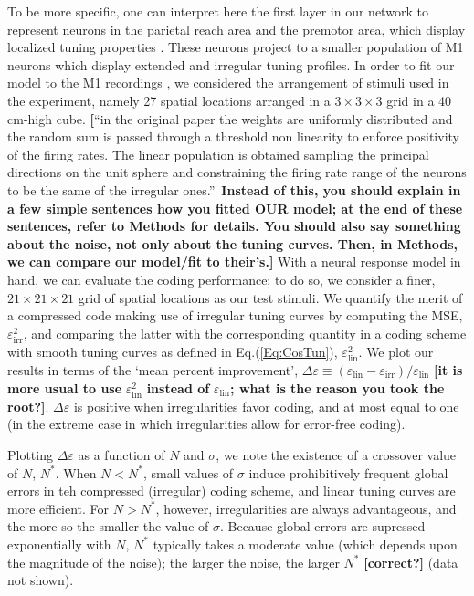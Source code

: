 \documentclass[a4paper]{article}%
\begin{document}
To be more specific, one can interpret here the first layer in our network to
represent neurons in the parietal reach area and the premotor area, which
display localized tuning properties \cite{Andersen1985EncodingNeurons}. These
neurons project to a smaller population of M1 neurons which display extended
and irregular tuning profiles. In order to fit our model to the M1 recordings
\cite{Lalazar2016TuningConnectivity}, we considered the arrangement of stimuli
used in the experiment, namely 27 spatial locations arranged in a
$3\times3\times3$ grid in a 40 cm-high cube.\textbf{ [}\textquotedblleft in
the original paper the weights are uniformly distributed and the random sum is
passed through a threshold non linearity to enforce positivity of the firing
rates. The linear population is obtained sampling the principal directions on
the unit sphere and constraining the firing rate range of the neurons to be
the same of the irregular ones.\textquotedblright\ \textbf{Instead of this,
you should explain in a few simple sentences how you fitted OUR model; at the
end of these sentences, refer to Methods for details. You should also say
something about the noise, not only about the tuning curves. Then, in Methods,
we can compare our model/fit to their's.] }With a neural response model in
hand, we can evaluate the coding performance; to do so, we consider a finer,
$21\times21\times21$ grid of spatial locations as our test stimuli. We
quantify the merit of a compressed code making use of irregular tuning curves
by computing the MSE, $\varepsilon_{\text{irr}}^{2}$, and comparing the latter
with the corresponding quantity in a coding scheme with smooth tuning curves
as defined in Eq.(\ref{Eq:CosTun}), $\varepsilon_{\text{lin}}^{2}$. We plot
our results in terms of the `mean percent improvement', $\Delta\varepsilon
\equiv\left(  \varepsilon_{\text{lin}}-\varepsilon_{\text{irr}}\right)
/\varepsilon_{\text{lin}}$ \textbf{[it is more usual to use }$\varepsilon
_{\text{lin}}^{2}$\textbf{ instead of }$\varepsilon_{\text{lin}}$\textbf{;
what is the reason you took the root?]}. $\Delta\varepsilon$ is positive when
irregularities favor coding, and at most equal to one (in the extreme case in
which irregularities allow for error-free coding).

Plotting $\Delta\varepsilon$ as a function of $N$ and $\sigma$, we note the
existence of a crossover value of $N$, $N^{\ast}$. When $N<N^{\ast}$, small
values of $\sigma$ induce prohibitively frequent global errors in teh
compressed (irregular) coding scheme, and linear tuning curves are more
efficient. For $N>N^{\ast}$, however, irregularities are always advantageous,
and the more so the smaller the value of $\sigma$. Because global errors are
supressed exponentially with $N$, $N^{\ast}$ typically takes a moderate value
(which depends upon the magnitude of the noise); the larger the noise, the
larger $N^{\ast}$ \textbf{[correct?]} (data not shown).
\end{document}
